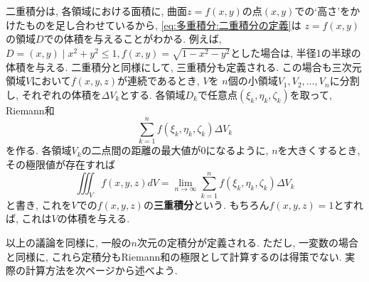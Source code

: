 \documentclass[a4j,dvipdfmx]{jsarticle}
\numberwithin{equation}{section}
\begin{document}
            二重積分は, 各領域における面積に, 曲面$z=f(x,y)$の点$(x,y)$での`高さ'をかけたものを足し合わせているから, \eqref{eq:多重積分:二重積分の定義}は
            $z=f(x,y)$の領域$D$での体積を与えることがわかる. 例えば, $D={(x,y)\mid x^2+y^2\leq 1},f(x,y)=\sqrt{1-x^2-y^2}$とした場合は, 
            半径1の半球の体積を与える.
            \clearpage
            二重積分と同様にして, 三重積分も定義される. この場合も三次元領域$V$において$f(x,y,z)$が連続であるとき, $V$を
            $n$個の小領域$V_1,V_2,\dots,V_n$に分割し, それぞれの体積を$\Delta V_k$とする. 各領域$D_k$で任意点$(\xi_k,\eta_k,\zeta_k)$を取って, Riemann和
            \begin{equation}
                \sum_{k=1}^nf(\xi_k,\eta_k,\zeta_k)\Delta V_k
            \end{equation} 
            を作る. 各領域$V_k$の二点間の距離の最大値が0になるように, $n$を大きくするとき, その極限値が存在すれば
            \begin{equation}
                \iiint_Vf(x,y,z)dV=\lim_{n\to\infty}\sum_{k=1}^nf(\xi_k,\eta_k,\zeta_k)\Delta V_k
            \end{equation}
            と書き, これを$V$での$f(x,y,z)$の\textbf{三重積分}という. もちろん$f(x,y,z)=1$とすれば, 
            これは$V$の体積を与える.

            以上の議論を同様に, 一般の$n$次元の定積分が定義される. ただし, 一変数の場合と同様に, これら定積分もRiemann和の極限として計算するのは得策でない.
            実際の計算方法を次ページから述べよう.
        \clearpage
\end{document}
